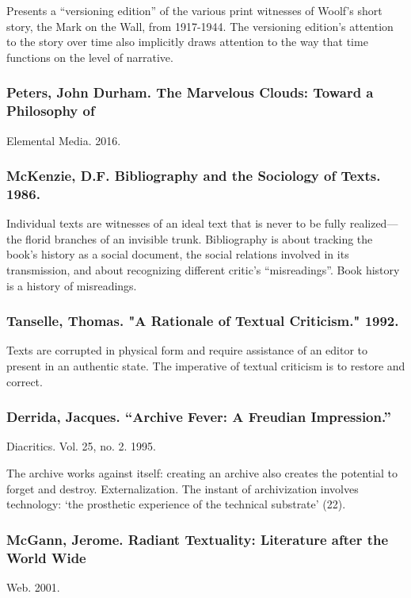 \documentclass[11pt]{article}
\begin{document}
Presents a “versioning edition” of the various print witnesses of
Woolf’s short story, the Mark on the Wall, from 1917-1944.  The
versioning edition’s attention to the story over time also implicitly
draws attention to the way that time functions on the level of
narrative.

\subsubsection{Peters, John Durham. The Marvelous Clouds: Toward a Philosophy of}
\label{sec:org29288aa}
Elemental Media. 2016.

\subsubsection{McKenzie, D.F. Bibliography and the Sociology of Texts. 1986.}
\label{sec:orgbef077b}

Individual texts are witnesses of an ideal text that is never to be
fully realized---the florid branches of an invisible trunk.
Bibliography is about tracking the book’s history as a social
document, the social relations involved in its transmission, and about
recognizing different critic’s “misreadings”. Book history is a
history of misreadings.

\subsubsection{Tanselle, Thomas. "A Rationale of Textual Criticism." 1992.}
\label{sec:orgad29351}

Texts are corrupted in physical form and require assistance of an
editor to present in an authentic state. The imperative of textual
criticism is to restore and correct.

\subsubsection{Derrida, Jacques. “Archive Fever: A Freudian Impression.”}
\label{sec:orgc5820ea}
Diacritics. Vol. 25, no. 2. 1995.

The archive works against itself: creating an archive also creates the
potential to forget and destroy. Externalization.  The instant of
archivization involves technology: ‘the prosthetic experience of the
technical substrate’ (22).

\subsubsection{McGann, Jerome. Radiant Textuality: Literature after the World Wide}
\label{sec:orga43a0e2}
Web. 2001.
\end{document}
